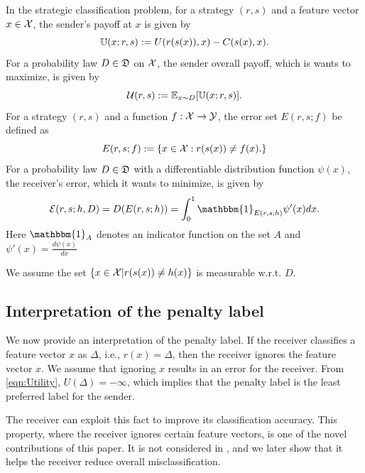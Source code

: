 In the strategic classification problem, for a strategy $(r,s)$ and a feature vector $x \in \mathcal{X}$, the sender's payoff at $x$ is given by
\begin{equation}
	\mathbb{U}(x;r,s):= U(r(s(x)),x) - C(s(x),x).
\end{equation}
For a probability law $D \in \mathfrak{D}$ on $\mathcal{X}$, the sender overall payoff, which is wants to maximize, is given by
\begin{equation}\label{eqn:Sender's payoff}
	\mathcal{U}(r,s) :=\mathbb{E}_{x \sim D}[\mathbb{U}(x;r,s)].
\end{equation}
For a strategy $(r,s)$ and a function $f: \mathcal{X} \rightarrow \mathcal{Y}$, the error set $E(r,s;f)$ be defined as
\begin{equation}\label{eqn:error set}
    E(r,s;f  ) := \{x \in \mathcal{X}: r(s(x)) \neq f(x).\}
\end{equation}
 For a probability law $D \in \mathfrak{D}$ with a differentiable distribution function $\psi(x)$,
the receiver's error, which it wants to minimize, is given by
\begin{equation}\label{eqn:Average loss}
	\cg{E}(r,s;h,D) = D(E(r,s;h)) = \int_0^1 \mathbbm{1}_{E(r,s;h)}{\psi'}(x)dx.
\end{equation}
Here $\mathbbm{1}_A$ denotes an indicator function on the set $A$ and
$\psi'(x) = \frac{d\psi(x)}{dx}$


\begin{rem}
	We assume the set $\{x \in \mathcal{X}| r(s(x)) \neq h(x)\}$ is measurable w.r.t. $D$.
\end{rem}

\subsection{Interpretation of the penalty label}
We now provide an interpretation of the penalty label. If the receiver classifies a feature vector $x$ as  $\Delta$, i.e., $r(x) = \Delta$, then the receiver ignores the feature vector $x$. We assume that ignoring $x$ results in an error for the receiver. From \eqref{eqn:Utility}, $U(\Delta) = -\infty$, which implies that the penalty label is the least preferred label for the sender.

The receiver can exploit this fact to improve its classification accuracy. This property, where the receiver ignores certain feature vectors, is one of the novel contributions of this paper. It is not considered in \cite{hardt2016strategic}, and we later show that it helps the receiver reduce overall misclassification.

